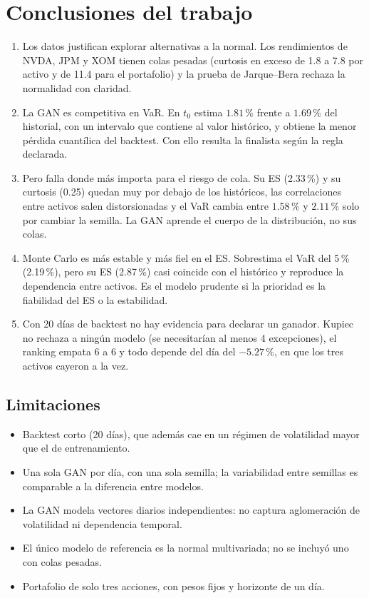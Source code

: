 \documentclass[12pt,letterpaper]{article}
\begin{document}
\section{Conclusiones del trabajo}\label{sec:conclusiones}

\begin{enumerate}[label=\arabic*., itemsep=2mm]
  \item Los datos justifican explorar alternativas a la normal. Los rendimientos de NVDA, JPM y XOM tienen colas pesadas (curtosis en exceso de 1.8 a 7.8 por activo y de 11.4 para el portafolio) y la prueba de Jarque--Bera rechaza la normalidad con claridad.
  \item La GAN es competitiva en VaR. En $t_0$ estima $1.81\,\%$ frente a $1.69\,\%$ del historial, con un intervalo que contiene al valor histórico, y obtiene la menor pérdida cuantílica del backtest. Con ello resulta la finalista según la regla declarada.
  \item Pero falla donde más importa para el riesgo de cola. Su ES (2.33\,\%) y su curtosis (0.25) quedan muy por debajo de los históricos, las correlaciones entre activos salen distorsionadas y el VaR cambia entre $1.58\,\%$ y $2.11\,\%$ solo por cambiar la semilla. La GAN aprende el cuerpo de la distribución, no sus colas.
  \item Monte Carlo es más estable y más fiel en el ES. Sobrestima el VaR del 5\,\% (2.19\,\%), pero su ES (2.87\,\%) casi coincide con el histórico y reproduce la dependencia entre activos. Es el modelo prudente si la prioridad es la fiabilidad del ES o la estabilidad.
  \item Con 20 días de backtest no hay evidencia para declarar un ganador. Kupiec no rechaza a ningún modelo (se necesitarían al menos 4 excepciones), el ranking empata 6 a 6 y todo depende del día del $-5.27\,\%$, en que los tres activos cayeron a la vez.
\end{enumerate}

\subsection*{Limitaciones}

\begin{itemize}[nosep]
  \item Backtest corto (20 días), que además cae en un régimen de volatilidad mayor que el de entrenamiento.
  \item Una sola GAN por día, con una sola semilla; la variabilidad entre semillas es comparable a la diferencia entre modelos.
  \item La GAN modela vectores diarios independientes: no captura aglomeración de volatilidad ni dependencia temporal.
  \item El único modelo de referencia es la normal multivariada; no se incluyó uno con colas pesadas.
  \item Portafolio de solo tres acciones, con pesos fijos y horizonte de un día.
\end{itemize}
\end{document}
